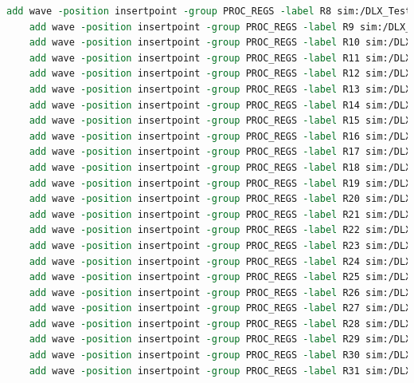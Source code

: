 \begin{lstlisting}[language=tcl,caption={Tcl script for staring the simulation and add the registers from R0 to R31},label=sim_wave]
	add wave -position insertpoint -group PROC_REGS -label R8 sim:/DLX_TestBench/DDLX/DataPath/RF/SEL_BLK/curr_proc_regs[31:0]
	add wave -position insertpoint -group PROC_REGS -label R9 sim:/DLX_TestBench/DDLX/DataPath/RF/SEL_BLK/curr_proc_regs[63:32]
	add wave -position insertpoint -group PROC_REGS -label R10 sim:/DLX_TestBench/DDLX/DataPath/RF/SEL_BLK/curr_proc_regs[95:64]
	add wave -position insertpoint -group PROC_REGS -label R11 sim:/DLX_TestBench/DDLX/DataPath/RF/SEL_BLK/curr_proc_regs[127:96]
	add wave -position insertpoint -group PROC_REGS -label R12 sim:/DLX_TestBench/DDLX/DataPath/RF/SEL_BLK/curr_proc_regs[159:128]
	add wave -position insertpoint -group PROC_REGS -label R13 sim:/DLX_TestBench/DDLX/DataPath/RF/SEL_BLK/curr_proc_regs[191:160]
	add wave -position insertpoint -group PROC_REGS -label R14 sim:/DLX_TestBench/DDLX/DataPath/RF/SEL_BLK/curr_proc_regs[223:192]
	add wave -position insertpoint -group PROC_REGS -label R15 sim:/DLX_TestBench/DDLX/DataPath/RF/SEL_BLK/curr_proc_regs[255:224]
	add wave -position insertpoint -group PROC_REGS -label R16 sim:/DLX_TestBench/DDLX/DataPath/RF/SEL_BLK/curr_proc_regs[287:256]
	add wave -position insertpoint -group PROC_REGS -label R17 sim:/DLX_TestBench/DDLX/DataPath/RF/SEL_BLK/curr_proc_regs[319:288]
	add wave -position insertpoint -group PROC_REGS -label R18 sim:/DLX_TestBench/DDLX/DataPath/RF/SEL_BLK/curr_proc_regs[351:320]
	add wave -position insertpoint -group PROC_REGS -label R19 sim:/DLX_TestBench/DDLX/DataPath/RF/SEL_BLK/curr_proc_regs[383:352]
	add wave -position insertpoint -group PROC_REGS -label R20 sim:/DLX_TestBench/DDLX/DataPath/RF/SEL_BLK/curr_proc_regs[415:384]
	add wave -position insertpoint -group PROC_REGS -label R21 sim:/DLX_TestBench/DDLX/DataPath/RF/SEL_BLK/curr_proc_regs[447:416]
	add wave -position insertpoint -group PROC_REGS -label R22 sim:/DLX_TestBench/DDLX/DataPath/RF/SEL_BLK/curr_proc_regs[479:448]
	add wave -position insertpoint -group PROC_REGS -label R23 sim:/DLX_TestBench/DDLX/DataPath/RF/SEL_BLK/curr_proc_regs[511:480]
	add wave -position insertpoint -group PROC_REGS -label R24 sim:/DLX_TestBench/DDLX/DataPath/RF/SEL_BLK/curr_proc_regs[543:512]
	add wave -position insertpoint -group PROC_REGS -label R25 sim:/DLX_TestBench/DDLX/DataPath/RF/SEL_BLK/curr_proc_regs[575:544]
	add wave -position insertpoint -group PROC_REGS -label R26 sim:/DLX_TestBench/DDLX/DataPath/RF/SEL_BLK/curr_proc_regs[607:576]
	add wave -position insertpoint -group PROC_REGS -label R27 sim:/DLX_TestBench/DDLX/DataPath/RF/SEL_BLK/curr_proc_regs[639:608]
	add wave -position insertpoint -group PROC_REGS -label R28 sim:/DLX_TestBench/DDLX/DataPath/RF/SEL_BLK/curr_proc_regs[671:640]
	add wave -position insertpoint -group PROC_REGS -label R29 sim:/DLX_TestBench/DDLX/DataPath/RF/SEL_BLK/curr_proc_regs[703:672]
	add wave -position insertpoint -group PROC_REGS -label R30 sim:/DLX_TestBench/DDLX/DataPath/RF/SEL_BLK/curr_proc_regs[735:704]
	add wave -position insertpoint -group PROC_REGS -label R31 sim:/DLX_TestBench/DDLX/DataPath/RF/SEL_BLK/curr_proc_regs[767:736]
\end{lstlisting}
	
